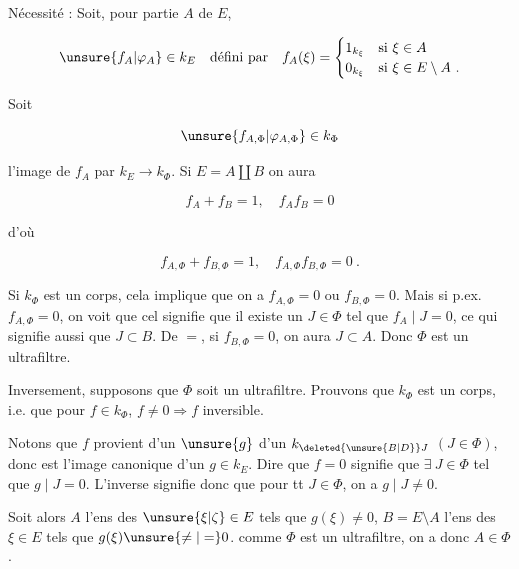 
Nécessité : Soit, pour  partie $A$ de $E$,

\[
\unsure{f_A|\varphi_A}\in k_E\quad\text{défini par}\quad f_A(\xi)=
\begin{cases}
1_{k_\xi}&\text{si }\xi\in A\\
0_{k_\xi}&\text{si }\xi\in E\setminus A\ .
\end{cases}
\]



\unsure{-} Soit

\[
\unsure{f_{A,\Phi}|\varphi_{A,\Phi}}\in k_\Phi
\]

l'image de $f_A$ par  $k_E\longrightarrow k_\Phi$. Si $E=A\amalg B$ on aura

\[
f_A+f_B=1,\quad f_A f_B=0
\]

d'où

\[
f_{A,\Phi}+f_{B,\Phi}=1,\quad f_{A,\Phi}f_{B,\Phi}=0\ .
\]

Si $k_\Phi$ est un corps, cela implique que  on a $f_{A,\Phi}=0$ ou $f_{B,\Phi}=0$. Mais si p.ex. $f_{A,\Phi}=0$, on voit que cel signifie que il existe un $J\in\Phi$ tel que $f_A\mid J=0$, ce qui signifie aussi que $J\subset B$. De $=$, si $f_{B,\Phi}=0$, on aura $J\subset A$. Donc $\Phi$ est un ultrafiltre.

Inversement, supposons que $\Phi$ soit un ultrafiltre.  Prouvons que $k_\Phi$ est un corps, i.e. que pour $f\in k_\Phi$, $f\ne0\Rightarrow f$ inversible.

 Notons que $f$ provient d'un $\unsure{g}$  d'un $k_{\deleted{\unsure{B|D}}J}$ $(J\in\Phi)$, donc est l'image canonique d'un $g\in k_E$. Dire que $f=0$ signifie que $\exists\ J\in\Phi$ tel que $g\mid J=0$. L'inverse  signifie donc que pour tt $J\in\Phi$, on a $g\mid J\ne0$.



Soit alors $A$ l'ens des $\unsure{\xi|\zeta}\in E$ tels que $g(\xi)\ne0$, $B=E\setminus A$ l'ens des $\xi\in E$ tels que $g(\xi)\unsure{\ne|=}0$.  comme $\Phi$ est un ultrafiltre, on a donc $A\in\Phi$.

